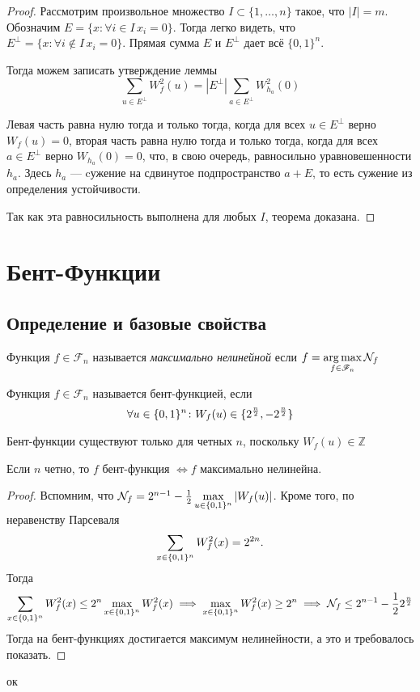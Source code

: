 \begin{proof}
Рассмотрим произвольное множество $I \subset \{1, \ldots, n\}$ такое, что $|I| = m$. 
Обозначим $E = \{x \colon \forall i\in I\, x_i = 0\}$. Тогда легко видеть, что $E^{\bot} 
= \{x \colon \forall i \not\in I\, x_i = 0\}$. Прямая сумма $E$ и $E^{\bot}$ дает всё $\{0,1\}^n$.

Тогда можем записать утверждение леммы
$$\sum\limits_{u \in E^{\bot}} W_f^2 (u) = |E^{\bot}| \sum\limits_{a \in E^{\bot}} W_{h_a}^2 (0)$$

Левая часть равна нулю тогда и только тогда, когда для всех $u \in E^{\bot}$ верно $W_f(u) = 0$,
вторая часть равна нулю тогда и только тогда, когда для всех $a \in E^{\bot}$ верно $W_{h_a} (0) = 0$,
что, в свою очередь, равносильно уравновешенности $h_a$. Здесь $h_a$ --- cужение на сдвинутое подпространство 
$a + E$, то есть сужение из определения устойчивости.

Так как эта равносильность выполнена для любых $I$, теорема доказана.

\end{proof}

\section{Бент-Функции}
\subsection{Определение и базовые свойства}
\begin{definition}
Функция $f \in \mathscr{F}_n$ называется \emph{максимально нелинейной} если
$f = \operatorname*{arg\,max}\limits_{f \in \mathscr{F}_n} \mathcal{N}_f$
\end{definition}

\begin{definition}
Функция $f \in \mathscr{F}_n$ называется бент-функцией, если 
$$\forall u \in \{0,1\}^n \colon W_f(u) \in \{2^{n \over 2}, - 2^{n \over 2}\}$$
\end{definition}

\begin{remark}
Бент-функции существуют только для четных $n$, поскольку $W_f(u) \in \mathbb{Z}$
\end{remark}

\begin{remark}
Если $n$ четно, то $f \text{ бент-функция } \iff f \text{ максимально нелинейна}$. 
\end{remark}

\begin{proof}
Вспомним, что $\mathcal{N}_f = 2^{n-1} - {1 \over 2}\max\limits_{u \in \{0,1\}^n} |W_f(u)|$.
Кроме того, по неравенству Парсеваля $$\sum\limits_{x \in \{0,1\}^n} W_f^2(x) = 2^{2n}.$$
Тогда
$$\sum\limits_{x \in \{0,1\}^n} W_f^2(x) \le 2^n \max\limits_{x \in \{0,1\}^n} W_f^2(x)
\implies \max\limits_{x \in \{0,1\}^n} W_f^2(x) \ge 2^n \implies
 \mathcal{N}_f \le 2^{n-1} - {1 \over 2} 2^{n \over 2}$$
Тогда на бент-функциях достигается максимум нелинейности, а это и требовалось показать.
\end{proof}ок

